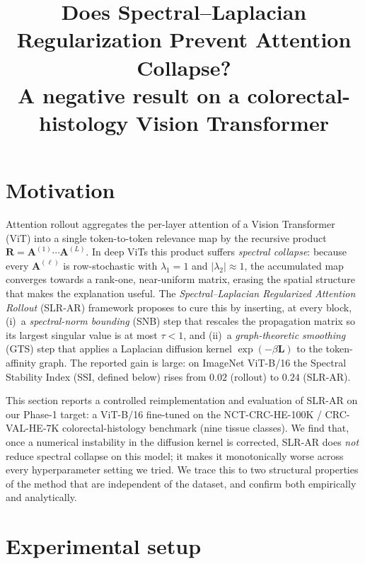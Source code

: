 \documentclass[11pt]{article}
\title{\textbf{Does Spectral--Laplacian Regularization Prevent Attention
Collapse?}\\[2pt]\large A negative result on a colorectal-histology
Vision Transformer}
\date{}
\newcommand{\A}{\mathbf{A}}
\newcommand{\Lap}{\mathbf{L}}
\newcommand{\R}{\mathbf{R}}
\begin{document}
\maketitle
\vspace{-2.0em}

\section{Motivation}

Attention rollout \cite{abnar2020} aggregates the per-layer attention of a
Vision Transformer (ViT) into a single token-to-token relevance map by the
recursive product $\R=\A^{(1)}\cdots\A^{(L)}$. In deep ViTs this product
suffers \emph{spectral collapse}: because every $\A^{(\ell)}$ is row-stochastic
with $\lambda_1=1$ and $|\lambda_2|\!\approx\!1$, the accumulated map converges
towards a rank-one, near-uniform matrix, erasing the spatial structure that
makes the explanation useful. The \emph{Spectral--Laplacian Regularized
Attention Rollout} (SLR-AR) framework proposes to cure this by inserting, at
every block, (i)~a \emph{spectral-norm bounding} (SNB) step that rescales the
propagation matrix so its largest singular value is at most $\tau<1$, and
(ii)~a \emph{graph-theoretic smoothing} (GTS) step that applies a Laplacian
diffusion kernel $\exp(-\beta\Lap)$ to the token-affinity graph. The reported
gain is large: on ImageNet ViT-B/16 the Spectral Stability Index (SSI,
defined below) rises from $0.02$ (rollout) to $0.24$ (SLR-AR).

This section reports a controlled reimplementation and evaluation of SLR-AR on
our Phase-1 target: a ViT-B/16 fine-tuned on the NCT-CRC-HE-100K /
CRC-VAL-HE-7K colorectal-histology benchmark (nine tissue classes). We find
that, once a numerical instability in the diffusion kernel is corrected, SLR-AR
does \emph{not} reduce spectral collapse on this model; it makes it
monotonically worse across every hyperparameter setting we tried. We trace this
to two structural properties of the method that are independent of the dataset,
and confirm both empirically and analytically.

\section{Experimental setup}
\end{document}
